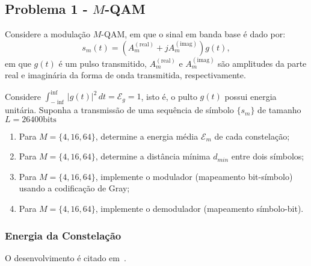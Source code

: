 \subsection{Problema 1 - $M$-QAM}

Considere a modulação $M$-QAM, em que o sinal em banda base é dado por:
$$s_m(t) = ( A_m^{(\text{real})} + j A_m^{(\text{imag})}) g(t) ,$$
em que $g(t)$ é um pulso transmitido, $A_m^{(\text{real})}$ e $A_m^{(\text{imag})}$ são amplitudes da parte real e imaginária da forma de onda transmitida, respectivamente.

Considere $\int_{-\inf}^{\inf} |g(t)|^2 \,dt = \mathcal{E}_{g} = 1$, isto é, o pulto $g(t)$ possui energia unitária. Suponha a transmissão de uma sequência de símbolo $\{s_{m}\}$ de tamanho $L = 26400 \text{bits}$
\begin{enumerate}
    \item Para $M = \{ 4, 16, 64\}$, determine a energia média $\mathcal{E}_{m}$ de cada constelação;
    \item Para $M = \{ 4, 16, 64\}$, determine a distância mínima $d_{min}$ entre dois símbolos;
    \item Para $M = \{ 4, 16, 64\}$, implemente o modulador (mapeamento bit-símbolo) usando a codificação de Gray;
    \item Para $M = \{ 4, 16, 64\}$, implemente o demodulador (mapeamento símbolo-bit).
\end{enumerate}





\subsubsection{Energia da Constelação} 

O desenvolvimento é citado em~\cite{Proakis, Cecilio}.


